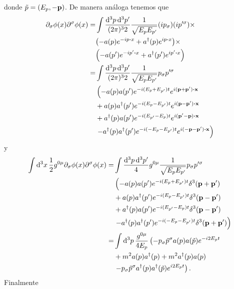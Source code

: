 \documentclass{article}
\begin{document}
donde $\tilde{p}=(E_p,-\vb{p})$. 
De manera análoga tenemos que
\begin{align}
\begin{split}
\partial_\sigma\phi(x)\partial^\sigma\phi(x)=&\int\frac{\dd[3]{p}\dd[3]{p'}}{(2\pi)^32}\frac{1}{\sqrt{E_pE_{p'}}}(ip_\sigma)(ip'^\sigma)\times\\
&\qty(- a(p)e^{-ip\vdot x}+ a^\dagger(p)e^{ip\vdot x})\times\\
&\qty(- a(p')e^{-ip'\vdot x}+ a^\dagger(p')e^{ip'\vdot x})\\
=&\int\frac{\dd[3]{p}\dd[3]{p'}}{(2\pi)^32}\frac{1}{\sqrt{E_pE_{p'}}}p_\sigma p'^\sigma\\
&\left(-a(p)a(p')e^{-i(E_p+E_{p'})t}e^{i(\vb{p}+\vb{p'})\vdot\vb{x}}\right.\\
&+a(p)a^\dagger(p')e^{-i(E_p-E_{p'})t}e^{i(\vb{p}-\vb{p'})\vdot\vb{x}}\\
&+a^\dagger(p)a(p')e^{-i(E_{p'}-E_p)t}e^{i(\vb{p'}-\vb{p})\vdot\vb{x}}\\
&\left.-a^\dagger(p)a^\dagger(p')e^{-i(-E_p-E_{p'})t}e^{i(-\vb{p}-\vb{p'})\vdot\vb{x}}\right)
\end{split}
\end{align}
y
\begin{align}
\begin{split}
\int\dd[3]{x}\frac{1}{2}g^{0\mu}\partial_\sigma\phi(x)\partial^\sigma\phi(x)=&\int\frac{\dd[3]{p}\dd[3]{p'}}{4}g^{0\mu}\frac{1}{\sqrt{E_pE_{p'}}}p_\sigma p'^\sigma\\
&\left(-a(p)a(p')e^{-i(E_p+E_{p'})t}\delta^3(\vb{p}+\vb{p'})\right.\\
&+a(p)a^\dagger(p')e^{-i(E_p-E_{p'})t}\delta^3(\vb{p}-\vb{p'})\\
&+a^\dagger(p)a(p')e^{-i(E_{p'}-E_p)t}\delta^3(\vb{p}-\vb{p'})\\
&\left.-a^\dagger(p)a^\dagger(p')e^{-i(-E_p-E_{p'})t}\delta^3(\vb{p}+\vb{p'})\right)\\
=&\int\dd[3]{p}\frac{g^{0\mu}}{4E_p}\left(-p_\sigma \tilde{p}^\sigma a(p)a(\tilde{p})e^{-i2E_pt}\right.\\
&+m^2a(p)a^\dagger(p)+m^2a^\dagger(p)a(p)\\
&\left.-p_\sigma \tilde{p}^\sigma a^\dagger(p)a^\dagger(\tilde{p})e^{i2E_pt}\right).
\end{split}
\end{align}
Finalmente
\end{document}
